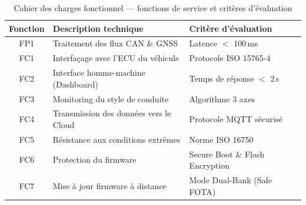 \begin{table}[H]
\centering
\renewcommand{\arraystretch}{1.4}
\caption{Cahier des charges fonctionnel — fonctions de service et
         critères d'évaluation}
\label{tab:fonctions_service}
\small
\begin{tabular}{|c|p{5.5cm}|p{5cm}|}
\hline
\rowcolor{gray!20}
\textbf{Fonction} & \textbf{Description technique} & \textbf{Critère d'évaluation} \\
\hline
FP1 & Traitement des flux CAN \& GNSS & Latence $<$ 100\,ms \\
\hline
FC1 & Interfaçage avec l'ECU du véhicule & Protocole ISO 15765-4 \\
\hline
FC2 & Interface homme-machine (Dashboard) & Temps de réponse $<$ 2\,s \\
\hline
FC3 & Monitoring du style de conduite & Algorithme 3 axes \\
\hline
FC4 & Transmission des données vers le Cloud & Protocole MQTT sécurisé \\
\hline
FC5 & Résistance aux conditions extrêmes & Norme ISO 16750 \\
\hline
FC6 & Protection du firmware & Secure Boot \& Flash Encryption \\
\hline
FC7 & Mise à jour firmware à distance & Mode Dual-Bank (Safe FOTA) \\
\hline
\end{tabular}
\end{table}

